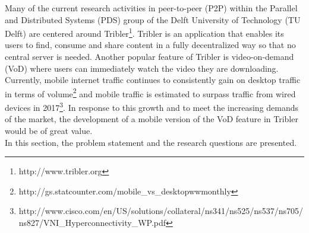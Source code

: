 Many of the current research activities in peer-to-peer (P2P) within the Parallel and Distributed Systems (PDS) group of the Delft University of Technology (TU Delft) are centered around Tribler\footnote{http://www.tribler.org}. Tribler is an application that enables its users to find, consume and share content in a fully decentralized way so that no central server is needed. Another popular feature of Tribler is video-on-demand (VoD) where users can immediately watch the video they are downloading. Currently, mobile internet traffic continues to consistently gain on desktop traffic in terms of volume\footnote{http://gs.statcounter.com/mobile\_vs\_desktop\-ww\-monthly} and mobile traffic is estimated to surpass traffic from wired devices in 2017\footnote{http://www.cisco.com/en/US/solutions/collateral/ns341/ns525/ns537/ns705/ns827/VNI\_Hyperconnectivity\_WP.pdf}. In response to this growth and to meet the increasing demands of the market, the development of a mobile version of the VoD feature in Tribler would be of great value.\\
In this section, the problem statement and the research questions are presented.